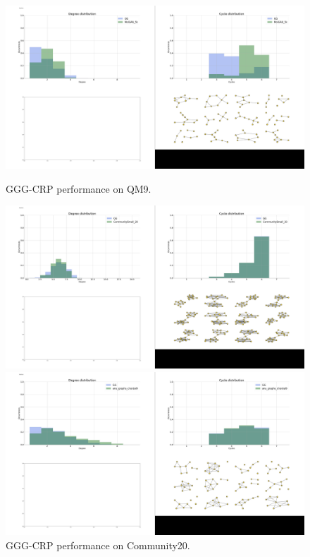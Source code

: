 \begin{figure}[!ht]
    \centering
    \begin{minipage}{0.475\textwidth}
    \centering
    \includegraphics[width=\textwidth]{figures/gggcrp/QM9.pdf}
    \caption{GGG-CRP performance on QM9.}
    \label{fig:qm9}    
    \end{minipage}
    \hfill
    \begin{minipage}{0.475\textwidth}
    \centering
    \includegraphics[width=\textwidth]{figures/gggcrp/CommunitySmall_20.pdf}
    \caption{GGG-CRP performance on Community20.}
    \label{fig:community_20}    
    \end{minipage}
    \begin{minipage}{0.475\textwidth}
    \centering
    \includegraphics[width=\textwidth]{figures/gggcrp/Chordal9.pdf}

\end{minipage}
\end{figure}

